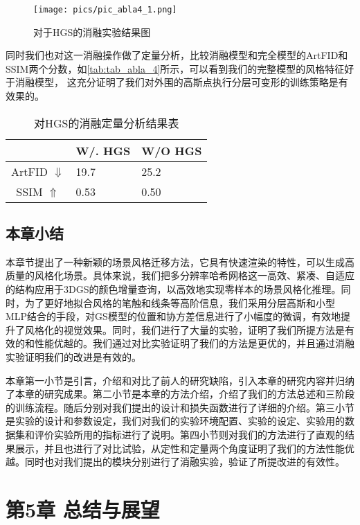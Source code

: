 \begin{figure}[htb]
    \centering
    \texttt{[image: pics/pic\_abla4\_1.png]}
    \caption{\label{fig:fig_abla_4}对于HGS的消融实验结果图}
\end{figure}

\par 同时我们也对这一消融操作做了定量分析，比较消融模型和完全模型的ArtFID和SSIM两个分数，如\autoref{tab:tab_abla_4}所示，可以看到我们的完整模型的风格特征好于消融模型，
这充分证明了我们对外围的高斯点执行分层可变形的训练策略是有效果的。
\begin{table}[htb]
    \caption{\label{tab:tab_abla_4}对HGS的消融定量分析结果表}
    \begin{tabularx}{\linewidth}{c  X<{\centering} X<{\centering}}
        \hline
          & W/. HGS & W/O HGS \\ \hline
        ArtFID $\Downarrow$  & 19.7 & 25.2 \\ 
        SSIM $\Uparrow$  & 0.53 &  0.50 \\ \hline
    \end{tabularx}
\end{table}
\section{本章小结}
本章节提出了一种新颖的场景风格迁移方法，它具有快速渲染的特性，可以生成高质量的风格化场景。具体来说，我们把多分辨率哈希网格这一高效、紧凑、自适应的结构应用于3DGS的颜色增量查询，以高效地实现零样本的场景风格化推理。同时，为了更好地拟合风格的笔触和线条等高阶信息，我们采用分层高斯和小型MLP结合的手段，对GS模型的位置和协方差信息进行了小幅度的微调，有效地提升了风格化的视觉效果。同时，我们进行了大量的实验，证明了我们所提方法是有效的和性能优越的。我们通过对比实验证明了我们的方法是更优的，并且通过消融实验证明我们的改进是有效的。
\par 本章第一小节是引言，介绍和对比了前人的研究缺陷，引入本章的研究内容并归纳了本章的研究成果。第二小节是本章的方法介绍，介绍了我们的方法总述和三阶段的训练流程。随后分别对我们提出的设计和损失函数进行了详细的介绍。第三小节是实验的设计和参数设定，我们对我们的实验环境配置、实验的设定、实验用的数据集和评价实验所用的指标进行了说明。第四小节则对我们的方法进行了直观的结果展示，并且也进行了对比试验，从定性和定量两个角度证明了我们的方法性能优越。同时也对我们提出的模块分别进行了消融实验，验证了所提改进的有效性。
\chapter{第5章 总结与展望}
